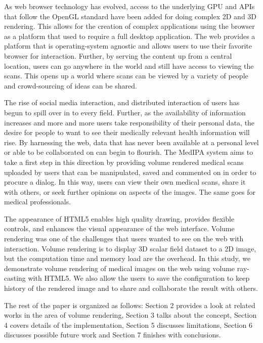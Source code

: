 \documentclass[annual]{acmsiggraph}
\begin{document}
As web browser technology has evolved, access to the underlying GPU and APIs that follow the OpenGL standard have been added for doing complex 2D and 3D rendering.  This allows for the creation of complex applications using the browser as a platform that used to require a full desktop application.  The web provides a platform that is operating-system agnostic and allows users to use their favorite browser for interaction.  Further, by serving the content up from a central location, users can go anywhere in the world and still have access to viewing the scans.  This opens up a world where scans can be viewed by a variety of people and crowd-sourcing of ideas can be shared.

The rise of social media interaction, and distributed interaction of users has begun to spill over in to every field.  Further, as the availability of information increases and more and more users take responsibility of their personal data, the desire for people to want to see their medically relevant health information will rise.  By harnessing the web, data that has never been available at a personal level or able to be collaborated on can begin to flourish.  The MedIPA system aims to take a first step in this direction by providing volume rendered medical scans uploaded by users that can be manipulated, saved and commented on in order to procure a dialog.  In this way, users can view their own medical scans, share it with others, or seek further opinions on aspects of the images.  The same goes for medical professionals.

The appearance of HTML5 enables high quality drawing, provides flexible controls, and enhances the visual appearance of the web interface. Volume rendering was one of the challenges that users wanted to see on the web with interaction. Volume rendering is to display 3D scalar field dataset to a 2D image, but the computation time and memory load are the overhead. In this study, we demonstrate volume rendering of medical images on the web using volume ray-casting with HTML5. We also allow the users to save the configuration to keep history of the rendered image and to share and collaborate the result with others. 

The rest of the paper is organized as follows: Section 2 provides a look at related works in the area of volume rendering, Section 3 talks about the concept, Section 4 covers details of the implementation, Section 5 discusses limitations, Section 6 discusses possible future work and Section 7 finishes with conclusions.
\end{document}
